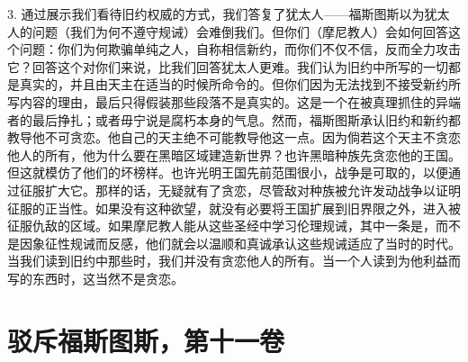 3. 通过展示我们看待旧约权威的方式，我们答复了犹太人——福斯图斯以为犹太人的问题（我们为何不遵守规诫）会难倒我们。但你们（摩尼教人）会如何回答这个问题：你们为何欺骗单纯之人，自称相信新约，而你们不仅不信，反而全力攻击它？回答这个对你们来说，比我们回答犹太人更难。我们认为旧约中所写的一切都是真实的，并且由天主在适当的时候所命令的。但你们因为无法找到不接受新约所写内容的理由，最后只得假装那些段落不是真实的。这是一个在被真理抓住的异端者的最后挣扎；或者毋宁说是腐朽本身的气息。然而，福斯图斯承认旧约和新约都教导他不可贪恋。他自己的天主绝不可能教导他这一点。因为倘若这个天主不贪恋他人的所有，他为什么要在黑暗区域建造新世界？也许黑暗种族先贪恋他的王国。但这就模仿了他们的坏榜样。也许光明王国先前范围很小，战争是可取的，以便通过征服扩大它。那样的话，无疑就有了贪恋，尽管敌对种族被允许发动战争以证明征服的正当性。如果没有这种欲望，就没有必要将王国扩展到旧界限之外，进入被征服仇敌的区域。如果摩尼教人能从这些圣经中学习伦理规诫，其中一条是，而不是因象征性规诫而反感，他们就会以温顺和真诚承认这些规诫适应了当时的时代。当我们读到旧约中那些时，我们并没有贪恋他人的所有。当一个人读到为他利益而写的东西时，这当然不是贪恋。\par



\section{驳斥福斯图斯，第十一卷}

\par

